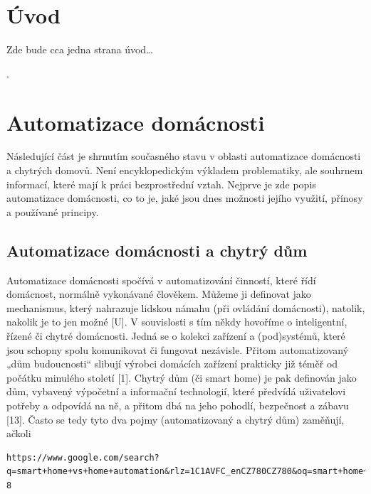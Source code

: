 \chapter{Úvod}
Zde bude cca jedna strana úvod…

\blindtext[2]
.


\chapter{Automatizace domácnosti}
Následující část je shrnutím současného stavu v oblasti automatizace domácnosti a chytrých domovů. Není encyklopedickým výkladem problematiky, ale souhrnem informací, které mají k práci bezprostřední vztah. Nejprve je zde popis automatizace domácnosti, co to je, jaké jsou dnes možnosti jejího využití, přínosy a používané principy.

\section{Automatizace domácnosti a chytrý dům}
Automatizace domácnosti spočívá v automatizování činností, které řídí domácnost, normálně vykonávané člověkem. Můžeme ji definovat jako mechanismus, který nahrazuje lidskou námahu (při ovládání domácnosti), natolik, nakolik je to jen možné [U]. V souvislosti s tím někdy hovoříme o inteligentní, řízené či chytré domácnosti. Jedná se o kolekci zařízení a (pod)systémů, které jsou schopny spolu komunikovat či fungovat nezávisle. Přitom automatizovaný „dům budoucnosti“ slibují výrobci domácích zařízení prakticky již téměř od počátku minulého století [1]. Chytrý dům (či smart home) je pak definován jako dům, vybavený výpočetní a informační technologií, které předvídá uživatelovi potřeby a odpovídá na ně, a přitom dbá na jeho pohodlí, bezpečnost a zábavu [13]. Často se tedy tyto dva pojmy (automatizovaný a chytrý dům) zaměňují, ačkoli 
\begin{verbatim}
https://www.google.com/search?q=smart+home+vs+home+automation&rlz=1C1AVFC_enCZ780CZ780&oq=smart+home+vs+hom&aqs=chrome.0.0i19j69i57j0i19i22i30j0i5i13i19i30l5.7375j0j7&sourceid=chrome&ie=UTF-8
\end{verbatim}




